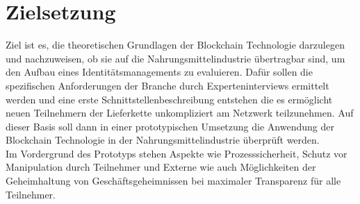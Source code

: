 \section{Zielsetzung}

Ziel ist es, die theoretischen Grundlagen der Blockchain Technologie darzulegen und nachzuweisen, ob sie auf die Nahrungsmittelindustrie übertragbar sind, um den Aufbau eines Identitätsmanagements zu evaluieren. Dafür sollen die spezifischen Anforderungen der Branche durch Experteninterviews ermittelt werden und eine erste Schnittstellenbeschreibung entstehen die es ermöglicht neuen Teilnehmern der Lieferkette unkompliziert am Netzwerk teilzunehmen. Auf dieser Basis soll dann in einer prototypischen Umsetzung die Anwendung der Blockchain Technologie in der Nahrungsmittelindustrie überprüft werden.\\

Im Vordergrund des Prototyps stehen Aspekte wie Prozesssicherheit, Schutz vor Manipulation durch Teilnehmer und Externe wie auch Möglichkeiten der Geheimhaltung von Geschäftsgeheimnissen bei maximaler Transparenz für alle Teilnehmer.\\


\newpage
